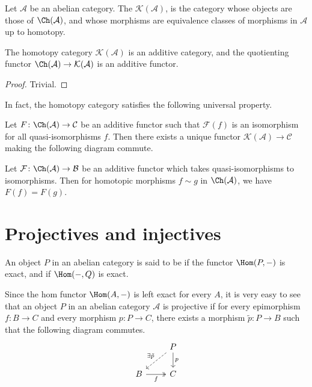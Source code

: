 \documentclass[main.tex]{subfiles}
\begin{document}
\begin{definition}
  \label{def:homotopy_category}
  Let $\mathcal{A}$ be an abelian category. The  $\mathcal{K}(\mathcal{A})$, is the category whose objects are those of $\Ch(\mathcal{A})$, and whose morphisms are equivalence classes of morphisms in $\mathcal{A}$ up to homotopy.
\end{definition}

\begin{lemma}
  \label{lemma:homotopy_category_is_additive}
  The homotopy category $\mathcal{K}(\mathcal{A})$ is an additive category, and the quotienting functor $\Ch(\mathcal{A}) \to \mathcal{K}(\mathcal{A})$ is an additive functor.
\end{lemma}
\begin{proof}
  Trivial.
\end{proof}

In fact, the homotopy category satisfies the following universal property.

\begin{proposition}
  Let $F\colon \Ch(\mathcal{A}) \to \mathcal{C}$ be an additive functor such that $\mathcal{F}(f)$ is an isomorphism for all quasi-isomorphisms $f$. Then there exists a unique functor $\mathcal{K}(\mathcal{A}) \to \mathcal{C}$ making the following diagram commute.
\end{proposition}

\begin{proposition}
  \label{prop:additive_functors_from_derived_category_squash_homotopies}
  Let $\mathcal{F}\colon \Ch(\mathcal{A}) \to \mathcal{B}$ be an additive functor which takes quasi-isomorphisms to isomorphisms. Then for homotopic morphisms $f \sim g$ in $\Ch(\mathcal{A})$, we have $F(f) = F(g)$.
\end{proposition}

\section{Projectives and injectives}
\label{ssc:projectives_and_injectives}

\begin{definition}
  \label{def:projective_injective}
  An object $P$ in an abelian category is said to be  if the functor $\Hom(P, -)$ is exact, and  if $\Hom(-, Q)$ is exact.
\end{definition}

Since the hom functor $\Hom(A, -)$ is left exact for every $A$, it is very easy to see that an object $P$ in an abelian category $\mathcal{A}$ is projective if for every epimorphism $f\colon B \to C$ and every morphism $p\colon P \to C$, there exists a morphism $\tilde{p}\colon P \to B$ such that the following diagram commutes.
\begin{equation*}
  \begin{tikzcd}
    & P
    \arrow[d, "p"]
    \arrow[dl, dashed, swap, "\exists\tilde{p}"]
    \\
    B
    \arrow[r, twoheadrightarrow, swap, "f"]
    & C
  \end{tikzcd}
\end{equation*}
\end{document}
